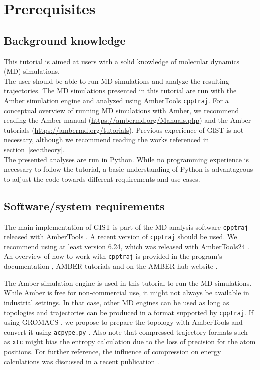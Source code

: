 \documentclass[9pt,tutorial]{livecoms}
\newcommand{\software}{\texttt}
\newcommand\inlinecode{\texttt}
\begin{document}
\section{Prerequisites}


\subsection{Background knowledge}
This tutorial is aimed at users with a solid knowledge of molecular dynamics (MD) simulations.\\
The user should be able to run MD simulations and analyze the resulting trajectories. 
The MD simulations presented in this tutorial are run with the Amber simulation engine and analyzed using AmberTools \software{cpptraj}. 
For a conceptual overview of running MD simulations with Amber, we recommend reading the Amber manual (\url{https://ambermd.org/Manuals.php}) \cite{amber24} and the Amber tutorials (\url{https://ambermd.org/tutorials}). 
Previous experience of GIST is not necessary, although we recommend reading the works referenced in section~\ref{sec:theory}.\\
The presented analyses are run in Python.
While no programming experience is necessary to follow the tutorial, a basic understanding of Python is advantageous to adjust the code towards different requirements and use-cases.

\subsection{Software/system requirements}
The main implementation of GIST is part of the MD analysis software \software{cpptraj} released with AmberTools \cite{amber24, Case2023-ambertools}.
A recent version of \software{cpptraj} should be used. We recommend using at least version 6.24, which was released with AmberTools24 \cite{Case2023-ambertools}. 
An overview of how to work with \software{cpptraj} is provided in the program's documentation \cite{cpptraj_doc}, AMBER tutorials \cite{amber_tut_cpptraj} and on the AMBER-hub website \cite{amber_hub}.

The Amber simulation engine is used in this tutorial to run the MD simulations.
While Amber is free for non-commercial use, it might not always be available in industrial settings.
In that case, other MD engines can be used as long as topologies and trajectories can be produced in a format supported by \software{cpptraj}.
If using GROMACS \cite{Abraham2015-gromacs,Pronk2013-gromacs}, we propose to prepare the topology with AmberTools \cite{Case2023-ambertools} and convert it using \software{acpype.py} \cite{Sousa_da_Silva2012-acpype}.
Also note that compressed trajectory formats such as \inlinecode{xtc} might bias the entropy calculation due to the loss of precision for the atom positions. For further reference, the influence of compression on energy calculations was discussed in a recent publication \cite{Roe2022-compression}.
\end{document}
